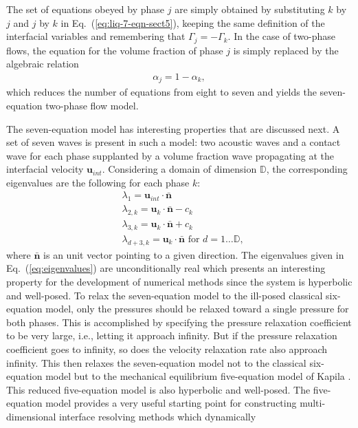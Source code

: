 \documentclass[preprint,10pt]{elsarticle}
\newcommand{\mbold}[1]{\boldsymbol#1}
\newcommand{\eqt}[1]{Eq.~(\ref{#1})}                     %
\begin{document}
The set of equations obeyed by phase $j$ are simply obtained by substituting $k$ by $j$ and $j$ by $k$ in \eqt{eq:liq-7-eqn-sect5}, keeping the same definition of the interfacial variables and remembering that $\Gamma_j = - \Gamma_k$. In the case of two-phase flows, the equation for the volume fraction of phase $j$ is simply replaced by the algebraic relation
%
\begin{align}
 \alpha_{j}= 1 - \alpha_{k}, \nonumber
\end{align}
%
which reduces the number of equations from eight to seven and yields the seven-equation two-phase flow model. 

The seven-equation model has interesting properties that are discussed next. A set of seven waves is present in such a model: two acoustic waves and a contact wave for each phase supplanted by a volume fraction wave propagating at the interfacial velocity $\mbold u_{int}$. Considering a domain of dimension $\mathbb{D}$, the corresponding eigenvalues are the following for each phase $k$:
% 
\begin{align}\label{eq:eigenvalues}
&\lambda_1 = \mbold u_{int} \cdot \bar{\mbold n} \nonumber\\
&\lambda_{2,k} = \mbold u_k \cdot \bar{\mbold n} - c_k \nonumber\\
&\lambda_{3,k} = \mbold u_k \cdot \bar{\mbold n} + c_k \\
&\lambda_{d+3,k} = \mbold u_k \cdot \bar{\mbold n} \text{ for } d = 1 \dots \mathbb{D},\nonumber
\end{align}
%
where $\bar{\mbold n}$ is an unit vector pointing to a given direction. The eigenvalues given in \eqt{eq:eigenvalues} are unconditionally real which presents an interesting property for the development of numerical methods since the system is hyperbolic and well-posed. To relax the seven-equation model to
the ill-posed classical six-equation model, only the pressures should be
relaxed toward a single pressure for both phases.  This is
accomplished by specifying the pressure relaxation coefficient to be
very large, i.e., letting it approach infinity.  But if the pressure
relaxation coefficient goes to infinity, so does the velocity
relaxation rate also approach infinity.  This then relaxes the
seven-equation model not to the classical six-equation model but to the
mechanical equilibrium five-equation model of Kapila \cite{Kapila_2001}.  This reduced
five-equation model is also hyperbolic and well-posed. The five-equation
model provides a very useful starting point for constructing
multi-dimensional interface resolving methods which dynamically
\end{document}
